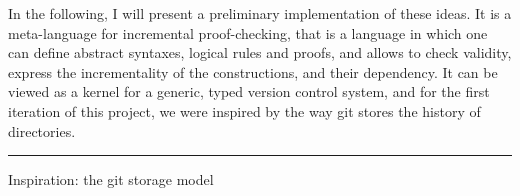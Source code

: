 \documentclass[ignorenonframetext,red]{beamer}
\begin{document}
In the following, I will present a preliminary implementation of these
ideas. It is a meta-language for incremental proof-checking, that is a
language in which one can define abstract syntaxes, logical rules and
proofs, and allows to check validity, express the incrementality of
the constructions, and their dependency. It can be viewed as a kernel
for a generic, typed version control system, and for the first
iteration of this project, we were inspired by the way \textsf{git}
stores the history of directories.

\hrule
\begin{frame}{Inspiration: the \textsf{git} storage model}
  \begin{center}
    \begin{overlayarea}{\textwidth}{12em}

\end{overlayarea}
\end{center}
\end{frame}
\end{document}
